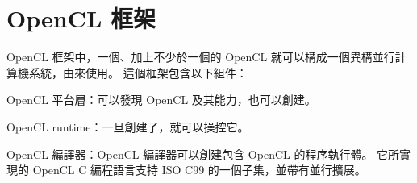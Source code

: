\section{OpenCL 框架}
OpenCL 框架中，一個、加上不少於一個的 OpenCL 就可以構成一個異構並行計算機系統，由來使用。
這個框架包含以下組件：
\startigBase
\item {\ftEmp OpenCL 平台層：}可以發現 OpenCL 及其能力，也可以創建。

\item {\ftEmp OpenCL runtime：}一旦創建了，就可以操控它。

\item {\ftEmp OpenCL 編譯器：}OpenCL 編譯器可以創建包含 OpenCL 的程序執行體。
它所實現的 OpenCL C 編程語言支持 ISO C99 的一個子集，並帶有並行擴展。
\stopigBase

